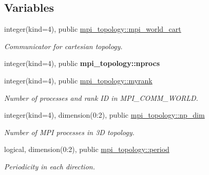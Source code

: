 \subsection*{Variables}
\begin{DoxyCompactItemize}
\item 
\mbox{\label{namespacempi__topology_a893b6fb583833278f1fd992cd4d4cbf8}} 
integer(kind=4), public \hyperlink{namespacempi__topology_a893b6fb583833278f1fd992cd4d4cbf8}{mpi\+\_\+topology\+::mpi\+\_\+world\+\_\+cart}
\begin{DoxyCompactList}\small\item\em Communicator for cartesian topology. \end{DoxyCompactList}\item 
\mbox{\label{namespacempi__topology_af16caa219178ffc6fb90822629db8a49}} 
integer(kind=4), public {\bfseries mpi\+\_\+topology\+::nprocs}
\item 
\mbox{\label{namespacempi__topology_a27f9bdf05c9c90f0c087aeb26b99a4f3}} 
integer(kind=4), public \hyperlink{namespacempi__topology_a27f9bdf05c9c90f0c087aeb26b99a4f3}{mpi\+\_\+topology\+::myrank}
\begin{DoxyCompactList}\small\item\em Number of processes and rank ID in M\+P\+I\+\_\+\+C\+O\+M\+M\+\_\+\+W\+O\+R\+LD. \end{DoxyCompactList}\item 
\mbox{\label{namespacempi__topology_a8f8932a2511cfd89285a6f2eb906d098}} 
integer(kind=4), dimension(0\+:2), public \hyperlink{namespacempi__topology_a8f8932a2511cfd89285a6f2eb906d098}{mpi\+\_\+topology\+::np\+\_\+dim}
\begin{DoxyCompactList}\small\item\em Number of M\+PI processes in 3D topology. \end{DoxyCompactList}\item 
\mbox{\label{namespacempi__topology_ac24cb383bdfbdf566165cf78b03677aa}} 
logical, dimension(0\+:2), public \hyperlink{namespacempi__topology_ac24cb383bdfbdf566165cf78b03677aa}{mpi\+\_\+topology\+::period}
\begin{DoxyCompactList}\small\item\em Periodicity in each direction. \end{DoxyCompactList}\item 

\end{DoxyCompactItemize}

